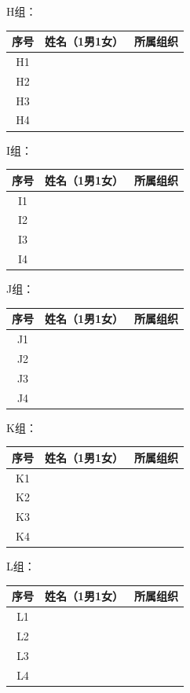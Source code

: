 \documentclass{article}
\begin{document}
\begin{CJK}{UTF8}{gbsn}
\begin{table}[htbp]
H组：	\centering
	\begin{tabular}{|c|c|c|}
		\hline	
		序号& 姓名（1男1女）& 	所属组织\\\hline
		H1	&&\\\hline
		H2	&&	\\\hline
		H3	&&	\\\hline
		H4	&&\\\hline
	\end{tabular}
\end{table}


\begin{table}[htbp]
I组：	\centering
	\begin{tabular}{|c|c|c|}
		\hline	
		序号& 姓名（1男1女）& 	所属组织\\\hline
		I1	&&\\\hline
		I2	&&	\\\hline
		I3	&&	\\\hline
		I4	&&\\\hline
	\end{tabular}
\end{table}


\begin{table}[htbp]
J组：	\centering
	\begin{tabular}{|c|c|c|}
		\hline	
		序号& 姓名（1男1女）& 	所属组织\\\hline
		J1	&&\\\hline
		J2	&&	\\\hline
		J3	&&	\\\hline
		J4	&&\\\hline
	\end{tabular}
\end{table}


\begin{table}[htbp]
K组：	\centering
	\begin{tabular}{|c|c|c|}
		\hline	
		序号& 姓名（1男1女）& 	所属组织\\\hline
		K1	&&\\\hline
		K2	&&	\\\hline
		K3	&&	\\\hline
		K4	&&\\\hline
	\end{tabular}
\end{table}


\begin{table}[htbp]
L组：	\centering
	\begin{tabular}{|c|c|c|}
		\hline	
		序号& 姓名（1男1女）& 	所属组织\\\hline
		L1	&&\\\hline
		L2	&&	\\\hline
		L3	&&	\\\hline
		L4	&&\\\hline
	\end{tabular}
\end{table}


\end{CJK}
\end{document}

